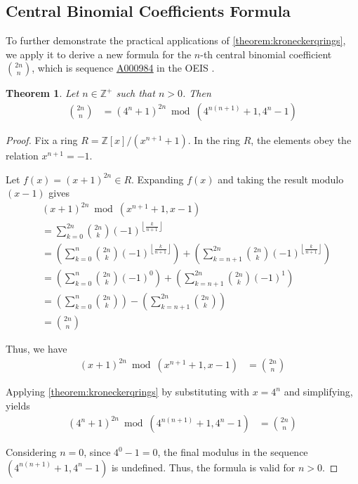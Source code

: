\documentclass[12pt,reqno]{article}
\theoremstyle{plain}
\newtheorem{theorem}{Theorem}
\theoremstyle{definition}
\newcommand{\floor}[1]{\left\lfloor #1 \right\rfloor}
\newcommand{\seqnum}[1]{\href{https://oeis.org/#1}{\rm \underline{#1}}}
\begin{document}
\subsection{Central Binomial Coefficients Formula}
To further demonstrate the practical applications of \cref{theorem:kroneckerqrings}, we apply it to derive a new formula for the $n$-th central binomial coefficient $\binom{2n}{n}$, which is sequence \seqnum{A000984} in the OEIS \cite{A000984}.

\begin{theorem}
Let $n \in \mathbb{Z}^+$ such that $n > 0$. Then
\begin{align*}
\binom{2n}{n} &= (4^n + 1)^{2n} \bmod{(4^{n(n+1)} + 1, 4^n - 1)}
\end{align*}
\end{theorem}
\begin{proof}
Fix a ring $R = \mathbb{Z}[x]/(x^{n+1} + 1)$. In the ring $R$, the elements obey the relation $x^{n+1} = -1$.

Let $f(x) = (x + 1)^{2n} \in R$. Expanding $f(x)$ and taking the result modulo $(x-1)$ gives
\begin{align*}
& (x + 1)^{2n} \bmod{(x^{n+1} + 1, x - 1)} \\
&= \sum_{k=0}^{2n} \binom{2n}{k} (-1)^{\floor{\frac{k}{n+1}}} \\
&= \left( \sum_{k=0}^{n} \binom{2n}{k} (-1)^{\floor{\frac{k}{n+1}}} \right) + \left( \sum_{k=n+1}^{2n} \binom{2n}{k} (-1)^{\floor{\frac{k}{n+1}}} \right) \\
&= \left( \sum_{k=0}^{n} \binom{2n}{k} (-1)^0 \right) + \left( \sum_{k=n+1}^{2n} \binom{2n}{k} (-1)^1 \right) \\
&= \left( \sum_{k=0}^{n} \binom{2n}{k} \right) - \left( \sum_{k=n+1}^{2n} \binom{2n}{k} \right) \\
&= \binom{2n}{n}
\end{align*}

Thus, we have
\begin{align*}
    (x + 1)^{2n} \bmod{(x^{n+1} + 1, x - 1)} &= \binom{2n}{n}
\end{align*}

Applying \cref{theorem:kroneckerqrings} by substituting with $x = 4^n$ and simplifying, yields
\begin{align*}
    (4^n + 1)^{2n} \bmod{(4^{n(n+1)} + 1, 4^n-1)} &= \binom{2n}{n}
\end{align*}

Considering $n = 0$, since $4^0-1 = 0$, the final modulus in the sequence $(4^{n(n+1)} + 1, 4^n-1)$ is undefined. Thus, the formula is valid for $n > 0$.
\end{proof}

\begingroup
\raggedright


\endgroup
\end{document}
